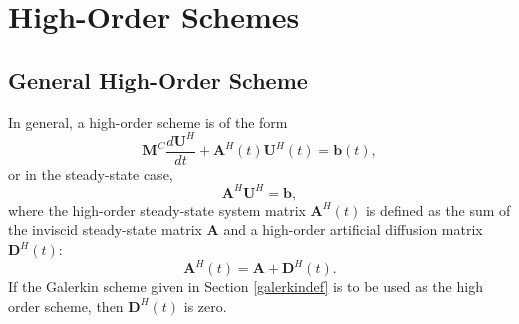 \section{High-Order Schemes}
\subsection{General High-Order Scheme}
In general, a high-order scheme is of the form
\begin{equation}\label{semidiscrete_high}
   \mathbf{M}^C\frac{d\mathbf{U}^{H}}{dt}
      + \mathbf{A}^H(t)\mathbf{U}^H(t)
      = \mathbf{b}(t),
\end{equation}
or in the steady-state case,
\begin{equation}\label{steadystate_high}
   \mathbf{A}^H\mathbf{U}^H = \mathbf{b},
\end{equation}
where the high-order steady-state system matrix $\mathbf{A}^H(t)$ is
defined as the sum of the inviscid steady-state matrix $\mathbf{A}$
and a high-order artificial diffusion matrix $\mathbf{D}^H(t)$:
\begin{equation}
   \mathbf{A}^H(t) = \mathbf{A} + \mathbf{D}^H(t).
\end{equation}
If the Galerkin scheme given in Section \ref{galerkindef} is to be
used as the high order scheme, then $\mathbf{D}^H(t)$ is zero.
